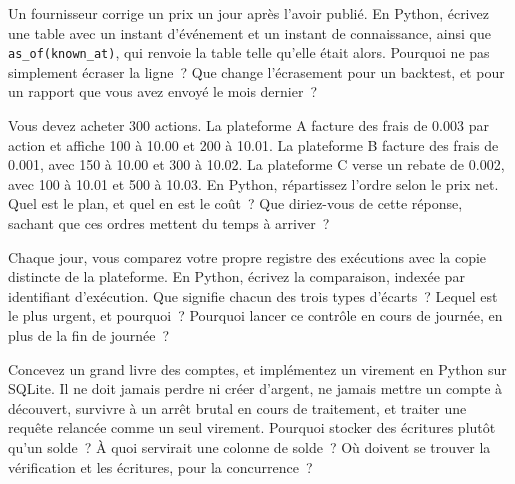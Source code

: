 \begin{question}\label{iq:iv3:system-design:20}
Un fournisseur corrige un prix un jour après l'avoir publié. En Python, écrivez une table avec un instant d'événement et un instant de connaissance, ainsi que \texttt{as\_of(known\_at)}, qui renvoie la table telle qu'elle était alors. Pourquoi ne pas simplement écraser la ligne~? Que change l'écrasement pour un backtest, et pour un rapport que vous avez envoyé le mois dernier~?
\end{question}

\begin{question}\label{iq:iv3:system-design:21}
Vous devez acheter 300 actions. La plateforme A facture des frais de 0.003 par action et affiche 100 à 10.00 et 200 à 10.01. La plateforme B facture des frais de 0.001, avec 150 à 10.00 et 300 à 10.02. La plateforme C verse un rebate de 0.002, avec 100 à 10.01 et 500 à 10.03. En Python, répartissez l'ordre selon le prix net. Quel est le plan, et quel en est le coût~? Que diriez-vous de cette réponse, sachant que ces ordres mettent du temps à arriver~?
\end{question}

\begin{question}\label{iq:iv3:system-design:22}
Chaque jour, vous comparez votre propre registre des exécutions avec la copie distincte de la plateforme. En Python, écrivez la comparaison, indexée par identifiant d'exécution. Que signifie chacun des trois types d'écarts~? Lequel est le plus urgent, et pourquoi~? Pourquoi lancer ce contrôle en cours de journée, en plus de la fin de journée~?
\end{question}

\begin{question}\label{iq:iv3:system-design:23}
Concevez un grand livre des comptes, et implémentez un virement en Python sur SQLite. Il ne doit jamais perdre ni créer d'argent, ne jamais mettre un compte à découvert, survivre à un arrêt brutal en cours de traitement, et traiter une requête relancée comme un seul virement. Pourquoi stocker des écritures plutôt qu'un solde~? À quoi servirait une colonne de solde~? Où doivent se trouver la vérification et les écritures, pour la concurrence~?
\end{question}

